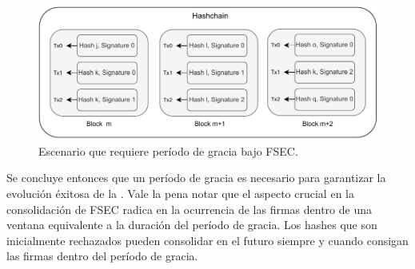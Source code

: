 \begin{figure}
  \centering
  \includegraphics[scale=0.7]{figures/grace_period.pdf}
  \caption{Escenario que requiere período de gracia bajo FSEC.}
  \label{fig:grace_period}
\end{figure}

%
Se concluye entonces que un período de gracia es necesario para garantizar la evolución
éxitosa de la \hashchain. 
%
Vale la pena notar que el aspecto crucial en la consolidación de FSEC radica en la ocurrencia
de las \SPH firmas dentro de una ventana equivalente a la duración
del período de gracia.
%
Los hashes que son inicialmente rechazados pueden consolidar en el futuro siempre y cuando
consigan las \SPH firmas dentro del período de gracia.
%


